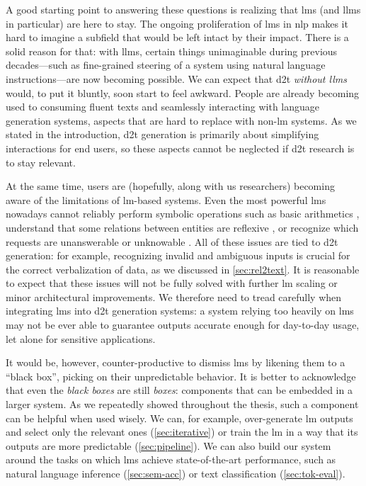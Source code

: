 A good starting point to answering these questions is realizing that \aclp{lm} (and \acsp{llm} in particular) are here to stay. The ongoing proliferation of \acp{lm} in \acl{nlp} \cite{min2023recent,zhao2023survey,naveed2024comprehensive} makes it hard to imagine a subfield that would be left intact by their impact. There is a solid reason for that: with \acp{llm}, certain things unimaginable during previous decades---such as fine-grained steering of a system using natural language instructions---are now becoming possible. We can expect that \ac{d2t} \emph{without \acp{llm}} would, to put it bluntly, soon start to feel awkward. People are already becoming used to consuming fluent texts and seamlessly interacting with language generation systems, aspects that are hard to replace with non-\ac{lm} systems. As we stated in the introduction, \ac{d2t} generation is primarily about simplifying interactions for end users, so these aspects cannot be neglected if \ac{d2t} research is to stay relevant.

At the same time, users are (hopefully, along with us researchers) becoming aware of the limitations of \ac{lm}-based systems. Even the most powerful \acp{lm} nowadays cannot reliably perform symbolic operations such as basic arithmetics \cite{qian2023limitations}, understand that some relations between entities are reflexive \cite{berglund2024the}, or recognize which requests are unanswerable or unknowable \cite{yin2023large}. All of these issues are tied to \ac{d2t} generation: for example, recognizing invalid and ambiguous inputs is crucial for the correct verbalization of data, as we discussed in \autoref{sec:rel2text}. It is reasonable to expect that these issues will not be fully solved with further \ac{lm} scaling or minor architectural improvements. We therefore need to tread carefully when integrating \acp{lm} into \ac{d2t} generation systems: a system relying too heavily on \acp{lm} may not be ever able to guarantee outputs accurate enough for day-to-day usage, let alone for sensitive applications.

It would be, however, counter-productive to dismiss \acp{lm} by likening them to a ``black box'', picking on their unpredictable behavior. It is better to acknowledge that even the \emph{black boxes} are still \emph{boxes}: components that can be embedded in a larger system. As we repeatedly showed throughout the thesis, such a component can be helpful when used wisely. We can, for example, over-generate \ac{lm} outputs and select only the relevant ones (\autoref{sec:iterative}) or train the \ac{lm} in a way that its outputs are more predictable (\autoref{sec:pipeline}). We can also build our system around the tasks on which \acp{lm} achieve state-of-the-art performance, such as natural language inference (\autoref{sec:sem-acc}) or text classification (\autoref{sec:tok-eval}).

